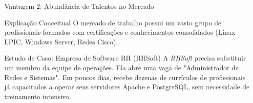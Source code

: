 \documentclass[9pt]{beamer}
\begin{document}
\begin{frame}[fragile]{Vantagem 2: Abundância de Talentos no Mercado}
\begin{block}{Explicação Conceitual}
O mercado de trabalho possui um vasto grupo de profissionais formados com certificações e conhecimentos consolidados (Linux LPIC, Windows Server, Redes Cisco).
\end{block}

\vspace{0.2cm}
\begin{exampleblock}{Estudo de Caso: Empresa de Software RH (RHSoft)}
A \textit{RHSoft} precisa substituir um membro da equipe de operações. Ela abre uma vaga de "Administrador de Redes e Sistemas". Em poucos dias, recebe dezenas de currículos de profissionais já capacitados a operar seus servidores Apache e PostgreSQL, sem necessidade de treinamento intensivo.
\end{exampleblock}

\vspace{0.2cm}
\begin{center}
\end{center}
\end{frame}
\end{document}
